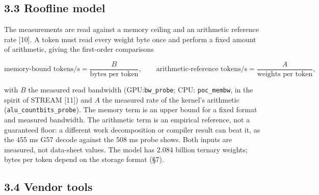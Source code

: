 \documentclass[
  10pt,
]{article}
\begin{document}
\subsection{3.3 Roofline model}\label{roofline-model}

The measurements are read against a memory ceiling and an arithmetic
reference rate [10]. A token must read every weight byte once and perform
a fixed amount of arithmetic, giving the first-order comparisons

\[
\text{memory-bound tokens/s} = \frac{B}{\text{bytes per token}},\qquad
\text{arithmetic-reference tokens/s} = \frac{A}{\text{weights per token}},
\]

with \(B\) the measured read bandwidth (GPU:\@ \texttt{bw\_probe}; CPU:\@
\texttt{poc\_membw}, in the spirit of STREAM [11]) and \(A\) the
measured rate of the kernel's arithmetic
(\texttt{alu\_countbits\_probe}). The memory term is an upper bound for a
fixed format and measured bandwidth. The arithmetic term is an empirical
reference, not a guaranteed floor: a different work decomposition or
compiler result can beat it, as the 455 ms G57 decode against the 508 ms
probe shows. Both inputs are measured, not data-sheet values. The model
has 2.084 billion ternary weights; bytes per token depend on the storage
format (\S{}7).

\subsection{3.4 Vendor tools}\label{vendor-tools}
\end{document}

